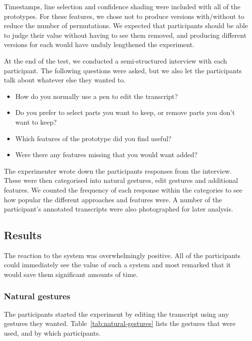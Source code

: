 Timestamps, line selection and confidence shading were included with all of the prototypes. For these features, we
chose not to produce versions with/without to reduce the number of permutations. We expected that participants should
be able to judge their value without having to see them removed, and producing different versions for each would have
unduly lengthened the experiment.

At the end of the test, we conducted a semi-structured interview with each participant. The following questions were
asked, but we also let the participants talk about whatever else they wanted to.

{\singlespacing
  \begin{itemize}
    \item How do you normally use a pen to edit the transcript?
    \item Do you prefer to select parts you want to keep, or remove parts you don't want to keep?
    \item Which features of the prototype did you find useful?
    \item Were there any features missing that you would want added?
  \end{itemize}
}

The experimenter wrote down the participants responses from the interview. These were then categorised into natural
gestures, edit gestures and additional features. We counted the frequency of each response within the categories to see
how popular the different approaches and features were. A number of the participant's annotated transcripts were also
photographed for later analysis.

\subsection{Results}
The reaction to the system was overwhelmingly positive. All of the participants could immediately see the value of such
a system and most remarked that it would save them significant amounts of time.

\subsubsection{Natural gestures}

The participants started the experiment by editing the transcript using any gestures they wanted.
Table~\ref{tab:natural-gestures} lists the gestures that were used, and by which participants.

